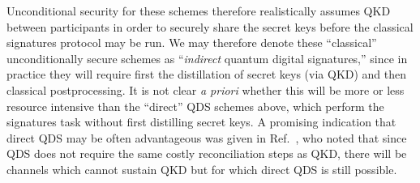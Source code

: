Unconditional security for these schemes therefore realistically assumes QKD between participants in order to securely share the secret keys before the classical signatures protocol may be run. We may therefore denote these ``classical'' unconditionally secure schemes as ``\emph{indirect} quantum digital signatures,'' since in practice they will require first the distillation of secret keys (via QKD) and then classical postprocessing. It is not clear \emph{a priori} whether this will be more or less resource intensive than the ``direct'' QDS schemes above, which perform the signatures task without first distilling secret keys. A promising indication that direct QDS may be often advantageous was given in Ref.~\cite{Amiri2016}, who noted that since QDS does not require the same costly reconciliation steps as QKD, there will be channels which cannot sustain QKD but for which direct QDS is still possible.


%


